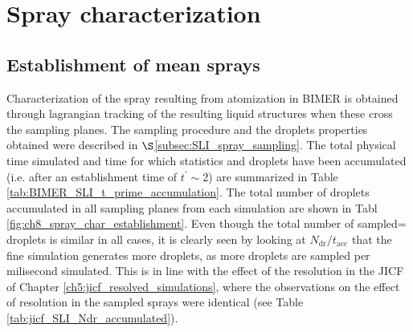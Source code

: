 \section{Spray characterization}
\label{sec:ch8_BIMER_spray_char}

\subsection{Establishment of mean sprays}

Characterization of the spray resulting from atomization in BIMER is obtained through lagrangian tracking of the resulting liquid structures when these cross the sampling planes. The sampling procedure and the droplets properties obtained were described in $\S$\ref{subsec:SLI_spray_sampling}. The total physical time simulated and time for which statistics and droplets have been accumulated (i.e. after an establishment time of $t^\prime \sim 2$) are summarized in Table \ref{tab:BIMER_SLI_t_prime_accumulation}.  The total number of droplets accumulated in all sampling planes from each simulation are shown in Tabl \ref{fig:ch8_spray_char_establishment}. Even though the total number of sampled= droplets is similar in all cases, it is clearly seen by looking at $N_\mathrm{dr}/t_\mathrm{acc}$ that the fine simulation generates more droplets, as more droplets are sampled per milisecond simulated. This is in line with the effect of the resolution in the JICF of Chapter \ref{ch5:jicf_resolved_simulations}, where the observations on the effect of resolution in the sampled sprays were identical (see Table \ref{tab:jicf_SLI_Ndr_accumulated}). 


